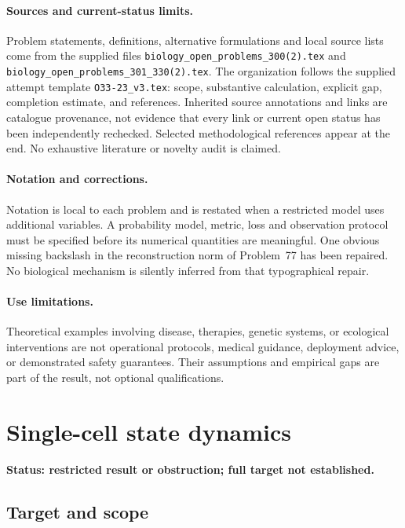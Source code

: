 \documentclass[11pt]{article}
\begin{document}
\paragraph{Sources and current-status limits.}
Problem statements, definitions, alternative formulations and local source lists
come from the supplied files
\texttt{biology\_open\_problems\_300(2).tex} and
\texttt{biology\_open\_problems\_301\_330(2).tex}.
The organization follows the supplied attempt template
\texttt{O33-23\_v3.tex}: scope, substantive calculation, explicit gap,
completion estimate, and references. Inherited source annotations and links are
catalogue provenance, not evidence that every link or current open status has
been independently rechecked. Selected methodological references appear at the
end. No exhaustive literature or novelty audit is claimed.

\paragraph{Notation and corrections.}
Notation is local to each problem and is restated when a restricted model uses
additional variables. A probability model, metric, loss and observation protocol
must be specified before its numerical quantities are meaningful. One obvious
missing backslash in the reconstruction norm of Problem~77 has been repaired.
No biological mechanism is silently inferred from that typographical repair.

\paragraph{Use limitations.}
Theoretical examples involving disease, therapies, genetic systems, or ecological
interventions are not operational protocols, medical guidance, deployment advice,
or demonstrated safety guarantees. Their assumptions and empirical gaps are part
of the result, not optional qualifications.


\section*{Single-cell state dynamics}
\label{prob:048}
\noindent\textbf{Status: restricted result or obstruction; full target not established.}
\subsection{Target and scope}
\end{document}
